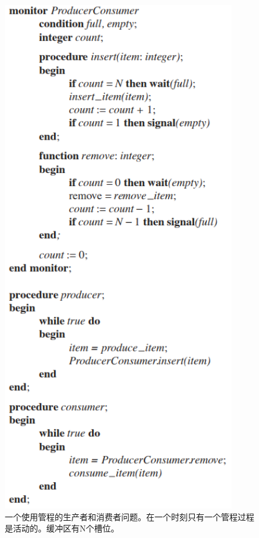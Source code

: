 	\begin{figure}[ht]\small
		\centering
		\includegraphics[width=0.90\textwidth]{FIG/2-34.png}
		\caption{一个使用管程的生产者和消费者问题。在一个时刻只有一个管程过程是活动的。缓冲区有N个槽位。}\label{fig:monitor-producer-consumer}
	\end{figure}

